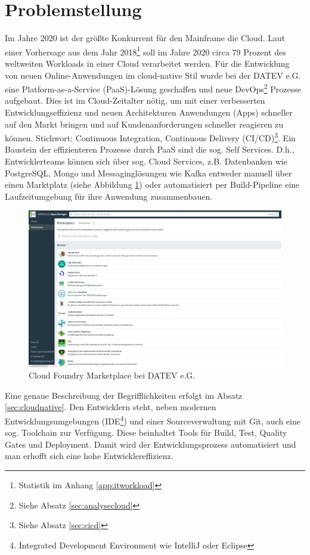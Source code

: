\section{Problemstellung}\label{sec:probstell}
Im Jahre 2020 ist der größte Konkurrent für den Mainframe die Cloud.
Laut einer Vorhersage aus dem Jahr 2018\footnote{Statistik im Anhang \ref{app:itworkload}} soll im Jahre 2020 circa 79 Prozent des weltweiten Workloads in einer Cloud verarbeitet werden.
Für die Entwicklung von neuen Online-Anwendungen im cloud-native Stil wurde bei der DATEV e.G. eine Platform-as-a-Service (PaaS)-Lösung geschaffen und neue DevOps\footnote{Siehe Absatz \ref{sec:analysecloud}} Prozesse aufgebaut.
Dies ist im Cloud-Zeitalter nötig, um mit einer verbesserten Entwicklungseffizienz und neuen Architekturen Anwendungen (\glqq Apps\grqq) schneller auf den Markt bringen und auf Kundenanforderungen schneller reagieren zu können. Stichwort: Continuous Integration, Continuous Delivery (CI/CD)\footnote{Siehe Absatz \ref{sec:cicd}}.
Ein Baustein der effizienteren Prozesse durch PaaS sind die sog. \glqq Self Services\grqq.
D.h., Entwicklerteams können sich über sog. \glqq Cloud Services\grqq, z.B. Datenbanken wie PostgreSQL, Mongo und Messaginglösungen wie Kafka entweder manuell über einen Marktplatz (siehe Abbildung \ref{fig:markt}) oder automatisiert per \glqq Build-Pipeline\grqq{} eine  Laufzeitumgebung für ihre Anwendung zusammenbauen.
\begin{figure}[h]
\centering
\includegraphics[width=\textwidth]{figures/CFMarketplace.jpg}
\caption{Cloud Foundry Marketplace bei DATEV e.G.}
\label{fig:markt}
\end{figure}
Eine genaue Beschreibung der Begrifflichkeiten erfolgt im Absatz \ref{sec:cloudnative}.
Den Entwicklern steht, neben modernen Entwicklungsumgebungen (IDE\footnote{Integrated Development Environment wie IntelliJ oder Eclipse}) und einer Sourceverwaltung mit Git, auch eine sog. \glqq Toolchain\grqq{} zur Verfügung. Diese beinhaltet Tools für Build, Test, Quality Gates und Deployment. 
Damit wird der Entwicklungsprozess automatisiert und man erhofft sich eine hohe Entwicklereffizienz.

